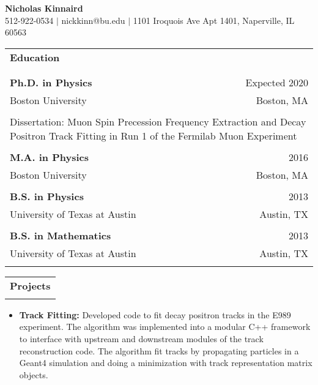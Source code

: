 
\thispagestyle{myheadings}

\begin{center}
  \textbf{{\LARGE Nicholas Kinnaird}} \\
  \small 512-922-0534 $\vert$ nickkinn@bu.edu $\vert$ 1101 Iroquois Ave Apt 1401, Naperville, IL 60563

\vspace{0.2in}
\begin{tabular*}{\linewidth}{@{\extracolsep{\fill}}lr}
  \multicolumn{2}{l}{\textbf{{\Large Education}}} \\
\\
\hline
\\

  {\bf Ph.D. in Physics} 		& Expected 2020 \\
  Boston University      		& Boston, MA \\
  						 		& \\ 
	 \multicolumn{2}{R{\linewidth}}{Dissertation: Muon Spin Precession Frequency Extraction and Decay Positron Track Fitting in Run 1 of the Fermilab Muon \gmtwo Experiment} \\
  						 		& \\ 
  {\bf M.A. in Physics}  		& 2016 \\
  Boston University      		& Boston, MA \\
  						 		& \\ 
  {\bf B.S. in Physics}  		& 2013 \\
  University of Texas at Austin & Austin, TX \\
  						 		& \\ 
  {\bf B.S. in Mathematics}     & 2013 \\
  University of Texas at Austin & Austin, TX \\
  						 		& \\ 
\end{tabular*}

\vspace{0.2in}
\begin{tabular*}{\linewidth}{@{\extracolsep{\fill}}l}
  \multicolumn{1}{l}{\textbf{{\Large Projects}}} \\
\\
\hline
\end{tabular*}

\begin{itemize}
	\item{{\bf Track Fitting:} Developed code to fit decay positron tracks in the E989 experiment. The algorithm was implemented into a modular C++ framework to interface with upstream and downstream modules of the track reconstruction code. The algorithm fit tracks by propagating particles in a Geant4 simulation and doing a \chisq minimization with track representation matrix objects.}
	

\end{itemize}
\end{center}
